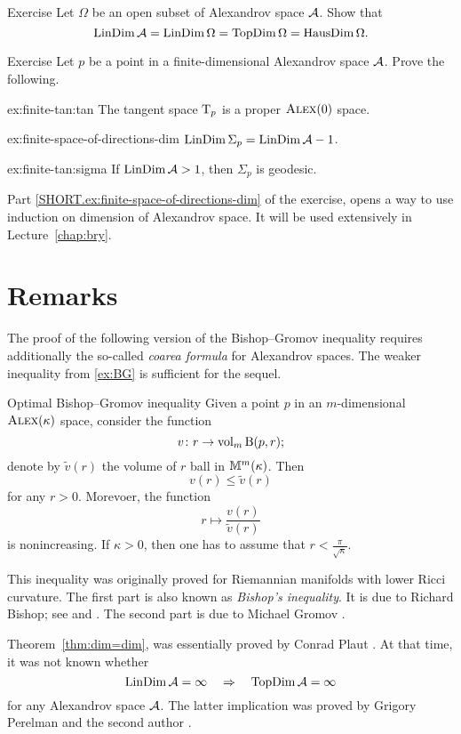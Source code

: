 \begin{thm}{Exercise}\label{ex:dim=dim}
Let $\Omega$ be an open subset of Alexandrov space $\mathcal{A}$.
Show that 
\[\mathop{\rm LinDim}\nolimits \mathcal{A}=\mathop{\rm LinDim}\nolimits \Omega=\mathop{\rm TopDim}\nolimits \Omega=\mathop{\rm HausDim}\nolimits \Omega.\]
\end{thm}

\begin{thm}[!]{Exercise}\label{ex:finite-tan}
Let $p$ be a point in a finite-dimensional Alexandrov space $\mathcal{A}$.
Prove the following.
\begin{subthm}{ex:finite-tan:tan}
The tangent space $\mathrm{T}_p$ is a proper $\textsc{Alex}(0)$ space.
\end{subthm}

\begin{subthm}{ex:finite-space-of-directions-dim}
$\mathop{\rm LinDim}\nolimits\Sigma_p=\mathop{\rm LinDim}\nolimits\mathcal{A}-1$.
\end{subthm}

\begin{subthm}{ex:finite-tan:sigma}
If $\mathop{\rm LinDim}\nolimits \mathcal{A}>1$, then $\Sigma_p$ is geodesic.
\end{subthm}

\end{thm}

Part \ref{SHORT.ex:finite-space-of-directions-dim} of the exercise, opens a way to use induction on dimension of Alexandrov space.
It will be used extensively in Lecture~\ref{chap:bry}.

\section{Remarks}

The proof of the following version of the Bishop--Gromov inequality requires additionally the so-called \textit{coarea formula} for Alexandrov spaces.
The weaker inequality from \ref{ex:BG} is sufficient for the sequel.

\begin{thm}{Optimal Bishop--Gromov inequality}\label{inq:BG+}
Given a point $p$ in an $m$-dimensional $\textsc{Alex}(\kappa)$ space,
consider the function
\[v\colon r\to\operatorname{\rm vol}\nolimits_m\mathrm{B}{}(p,r);\]
denote by $\tilde v(r)$ the volume of $r$ ball in $\mathbb{M}^m(\kappa)$.
Then 
\[v(r)\le \tilde v(r)\]
for any $r>0$.
Morevoer, the function
\[r\mapsto \frac{v(r)}{\tilde v(r)}\] is nonincreasing.
If $\kappa>0$, then one has to assume that $r<\tfrac\pi{\sqrt\kappa}$.
\end{thm}

This inequality was originally proved for Riemannian manifolds with lower Ricci curvature.
The first part is also known as \emph{Bishop's inequality}.
It is due to Richard Bishop; see \cite{bishop1964} and \cite[Corollary 4, p. 256]{bishop-crittenden}.
The second part is due to Michael Gromov \cite{gromov1981}.

Theorem~\ref{thm:dim=dim}, was essentially proved by Conrad Plaut \cite{plaut:dimension}.
At that time, it was not known whether
\[\mathop{\rm LinDim}\nolimits\mathcal{A}=\infty\quad \Rightarrow\quad \mathop{\rm TopDim}\nolimits\mathcal{A}=\infty\]
for any Alexandrov space $\mathcal{A}$.
The latter implication was proved by Grigory Perelman and the second author \cite{perelman-petrunin:qg}.

